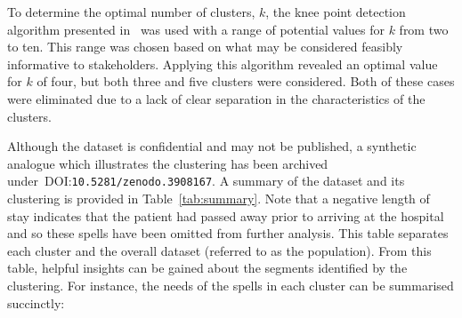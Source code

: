 \documentclass[]{interact}
\theoremstyle{plain}%
\theoremstyle{definition}
\theoremstyle{remark}
\begin{document}
To determine the optimal number of clusters, \(k\), the knee point detection
algorithm presented in~\cite{Satopaa2011} was used with a range of potential
values for \(k\) from two to ten. This range was chosen based on what may be
considered feasibly informative to stakeholders. Applying this algorithm
revealed an optimal value for \(k\) of four, but both three and five clusters
were considered. Both of these cases were eliminated due to a lack of clear
separation in the characteristics of the clusters.

\begin{table}
    \centering
    \resizebox{\textwidth}{!}{}
    \caption{%
        A summary of clinical and condition-specific characteristics for each
        cluster and the population
    }
    \label{tab:summary}
\end{table}

Although the dataset is confidential and may not be published, a synthetic
analogue which illustrates the clustering has been archived
under~DOI:\texttt{10.5281/zenodo.3908167}. A summary of the dataset and its
clustering is provided in Table~\ref{tab:summary}. Note that a negative length of stay
indicates that the patient had passed away prior to arriving at the hospital and
so these spells have been omitted from further analysis. This table separates
each cluster and the overall dataset (referred to as the population). From this
table, helpful insights can be gained about the segments identified by the
clustering. For instance, the needs of the spells in each cluster can be
summarised succinctly:
\end{document}
